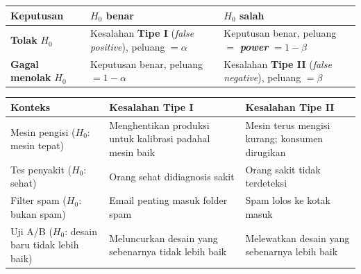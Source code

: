 \documentclass[
  indonesian,
  letterpaper,
]{book}
\newcounter{none} %
\begin{document}
{\def\LTcaptype{none} %
\begin{longtable}[]{@{}
  >{\raggedright\arraybackslash}p{}
  >{\raggedright\arraybackslash}p{}
  >{\raggedright\arraybackslash}p{}@{}}
\toprule\noalign{}
\begin{minipage}[b]{\linewidth}\raggedright
Keputusan
\end{minipage} & \begin{minipage}[b]{\linewidth}\raggedright
\(H_0\) benar
\end{minipage} & \begin{minipage}[b]{\linewidth}\raggedright
\(H_0\) salah
\end{minipage} \\
\midrule\noalign{}
\endhead
\bottomrule\noalign{}
\endlastfoot
\textbf{Tolak} \(H_0\) & Kesalahan \textbf{Tipe I} (\emph{false
positive}), peluang \(= \alpha\) & Keputusan benar, peluang \(=\)
\textbf{\emph{power}} \(= 1 - \beta\) \\
\textbf{Gagal menolak} \(H_0\) & Keputusan benar, peluang
\(= 1 - \alpha\) & Kesalahan \textbf{Tipe II} (\emph{false negative}),
peluang \(= \beta\) \\
\end{longtable}
}

{\def\LTcaptype{none} %
\begin{longtable}[]{@{}
  >{\raggedright\arraybackslash}p{}
  >{\raggedright\arraybackslash}p{}
  >{\raggedright\arraybackslash}p{}@{}}
\toprule\noalign{}
\begin{minipage}[b]{\linewidth}\raggedright
Konteks
\end{minipage} & \begin{minipage}[b]{\linewidth}\raggedright
Kesalahan Tipe I
\end{minipage} & \begin{minipage}[b]{\linewidth}\raggedright
Kesalahan Tipe II
\end{minipage} \\
\midrule\noalign{}
\endhead
\bottomrule\noalign{}
\endlastfoot
Mesin pengisi (\(H_0\): mesin tepat) & Menghentikan produksi untuk
kalibrasi padahal mesin baik & Mesin terus mengisi kurang; konsumen
dirugikan \\
Tes penyakit (\(H_0\): sehat) & Orang sehat didiagnosis sakit & Orang
sakit tidak terdeteksi \\
Filter spam (\(H_0\): bukan spam) & Email penting masuk folder spam &
Spam lolos ke kotak masuk \\
Uji A/B (\(H_0\): desain baru tidak lebih baik) & Meluncurkan desain
yang sebenarnya tidak lebih baik & Melewatkan desain yang sebenarnya
lebih baik \\
\end{longtable}
}
\end{document}
